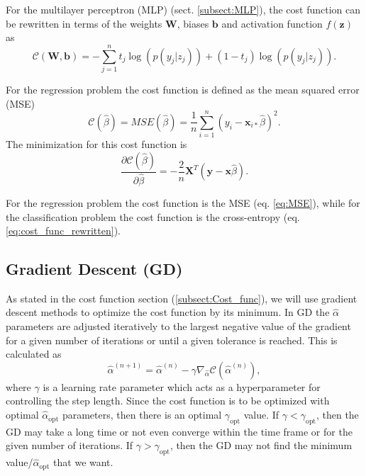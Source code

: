 \documentclass[12pt,a4paper,english]{article}
\begin{document}
For the multilayer perceptron (MLP) (sect. \ref{subsect:MLP}), the cost function can be rewritten in terms of the weights $\textbf{W}$, biases $\textbf{b}$ and activation function $f(\textbf{z})$ as
\begin{equation}
\label{eq:cost_MLP}
\mathcal{C}(\textbf{W},\textbf{b})=-\sum_{j=1}^{n}t_j\log(p(y_j|z_j))+(1-t_j)\log(p(y_j|z_j)).
\end{equation}

For the regression problem the cost function is defined as the mean squared error (MSE)
\begin{equation}
\label{eq:MSE}
\mathcal{C}(\hat{\beta})=MSE(\hat{\beta})=\frac{1}{n}\sum_{i=1}^{n}(y_i-\textbf{x}_{i*}\hat{\beta})^2.
\end{equation}
The minimization for this cost function is
\begin{equation}
\label{eq:MSE_deriv}
\frac{\partial \mathcal{C}(\hat{\beta})}{\partial \hat{\beta}}=-\frac{2}{n}\textbf{X}^T(\textbf{y}-\textbf{x}\hat{\beta}).
\end{equation}

For the regression problem the cost function is the MSE (eq. \ref{eq:MSE}), while for the classification problem the cost function is the cross-entropy (eq. \ref{eq:cost_func_rewritten}).

\subsection{Gradient Descent (GD)}
\label{sect: GD}
As stated in the cost function section (\ref{subsect:Cost_func}), we will use gradient descent methods to optimize the cost function by its minimum. In GD the $\hat{\alpha}$ parameters are adjusted iteratively to the largest negative value of the gradient for a given number of iterations or until a given tolerance is reached. This is calculated as
\begin{equation}
\label{eq:GD_general}
\hat{\alpha}^{(n+1)}=\hat{\alpha}^{(n)}-\gamma\nabla_{\hat{\alpha}} \mathcal{C}(\hat{\alpha}^{(n)}),
\end{equation}
where $\gamma$ is a learning rate parameter which acts as a hyperparameter for controlling the step length. Since the cost function is to be optimized with optimal $\hat{\alpha}_{\text{opt}}$ parameters, then there is an optimal $\gamma_{\text{opt}}$ value. If $\gamma<\gamma_{\text{opt}}$, then the GD may take a long time or not even converge within the time frame or for the given number of iterations. If $\gamma>\gamma_{\text{opt}}$, then the GD may not find the minimum value/$\hat{\alpha}_{\text{opt}}$ that we want.
\end{document}
